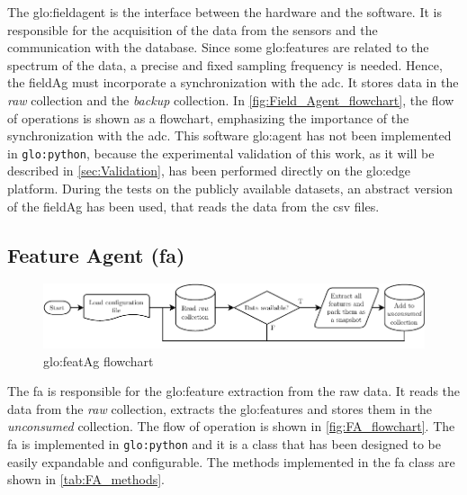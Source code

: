 The \gls{glo:fieldagent} is the interface between the hardware and the software. It is responsible for the acquisition of the data from the sensors and the communication with the database. Since some \gls{glo:feature}s are related to the spectrum of the data, a precise and fixed sampling frequency is needed. Hence, the \gls{fieldAg} must incorporate a synchronization with the \gls{adc}. It stores data in the \emph{raw} collection and the \emph{backup} collection. In \autoref{fig:Field_Agent_flowchart}, the flow of operations is shown as a flowchart, emphasizing the importance of the synchronization with the \gls{adc}. This software \gls{glo:agent} has not been implemented in \texttt{\gls{glo:python}}, because the experimental validation of this work, as it will be described in \autoref{sec:Validation}, has been performed directly on the \gls{glo:edge} platform. During the tests on the publicly available datasets, an abstract version of the \gls{fieldAg} has been used, that reads the data from the \gls{csv} files.


\subsection{Feature Agent (\gls{fa})}
\label{subsec:FeatureAgent}
\begin{figure}
    \centering
    \includegraphics[width=\textwidth]{images/Framework/FA_flowchart.pdf}
    \caption{\gls{glo:featAg} flowchart}
    \label{fig:FA_flowchart}
\end{figure}

The \gls{fa} is responsible for the \gls{glo:feature} extraction from the raw data. It reads the data from the \emph{raw} collection, extracts the \gls{glo:feature}s and stores them in the \emph{unconsumed} collection. The flow of operation is shown in \autoref{fig:FA_flowchart}. The \gls{fa} is implemented in \texttt{\gls{glo:python}} and it is a class that has been designed to be easily expandable and configurable. The methods implemented in the \gls{fa} class are shown in \autoref{tab:FA_methods}.


